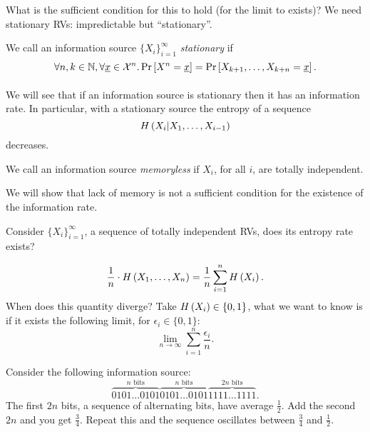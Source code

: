What is the sufficient condition for this to hold (\ie for the limit to exists)?
We need stationary \acp{RV}: impredictable but ``stationary''. 
\begin{definition}
	We call an information source $\{X_i\}_{i = 1}^\infty$ \emph{stationary} if 
	\begin{equation*}
		\forall n,k \in \mathbb{N}, \forall \underline{x} \in \mathcal{X}^n
		.
		\mathop{\mathrm{Pr}}\limits_{} \left[ {X^n = \underline{x}} \right] = \mathop{\mathrm{Pr}}\limits_{} \left[ {X_{k+1}, \dots, X_{k+n} = \underline{x}} \right].
	\end{equation*} 
\end{definition}

We will see that if an information source is stationary then it has an information rate.
In particular, with a stationary source the entropy of a sequence
\begin{equation*}
	H\left({X_i | X_1, \dots, X_{i-1}}\right)
\end{equation*}
decreases.

\begin{definition}
	We call an information source \emph{memoryless} if $X_i$, for all $i$, are totally independent.  
\end{definition}
We will show that lack of memory is not a sufficient condition for the existence of the information rate.

Consider $\{X_i\}_{i = 1}^\infty$, a sequence of totally independent \acp{RV}, does its entropy rate exists?

\begin{equation*}
	\frac{1}{n} \cdot H\left({X_1, \dots, X_n}\right)
	=
	\frac{1}{n} \sum_{i = 1}^n H\left({X_i}\right).
\end{equation*}
When does this quantity diverge?
Take $H\left({X_i}\right) \in \{0, 1\}$, what we want to know is if it exists the following limit, for $\epsilon_i \in \{0,1\}$:
\begin{equation*}
	\lim_{n \to \infty} \sum_{i = 1}^n \frac{\epsilon_i}{n}.
\end{equation*}

Consider the following information source:
\begin{equation*}
	\overbrace{0101\dots0101}^{n \text{ bits}}
	\overbrace{0101\dots0101}^{n \text{ bits}}
	\overbrace{1111\dots1111}^{2n \text{ bits}}.
\end{equation*}
The first $2n$ bits, a sequence of alternating bits, have average $\frac{1}{2}$.
Add the second $2n$ and you get $\frac{3}{4}$.
Repeat this and the sequence oscillates between $\frac{3}{4}$ and $\frac{1}{2}$.

